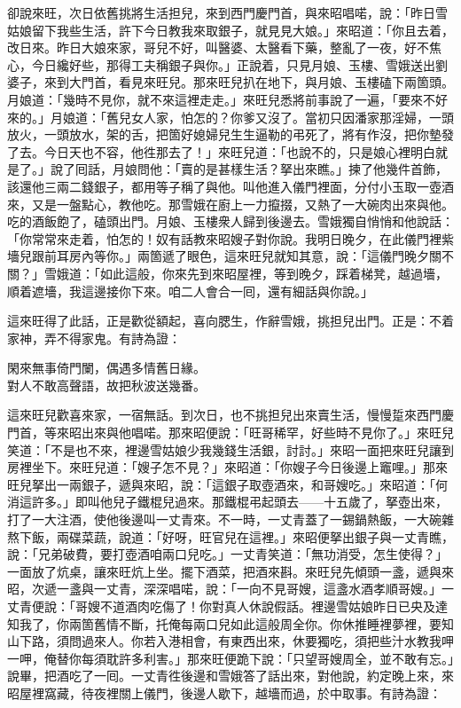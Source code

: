 卻說來旺，次日依舊挑將生活担兒，來到西門慶門首，與來昭唱喏，說：「昨日雪姑娘留下我些生活，許下今日教我來取銀子，就見見大娘。」來昭道：「你且去着，改日來。昨日大娘來家，哥兒不好，叫醫婆、太醫看下藥，整亂了一夜，好不焦心，今日纔好些，那得工夫稱銀子與你。」正說着，只見月娘、玉樓、雪娥送出劉婆子，來到大門首，看見來旺兒。那來旺兒扒在地下，與月娘、玉樓磕下兩箇頭。月娘道：「幾時不見你，就不來這裡走走。」來旺兒悉將前事說了一遍，「要來不好來的。」月娘道：「舊兒女人家，怕怎的？你爹又沒了。當初只因潘家那淫婦，一頭放火，一頭放水，架的舌，把箇好媳婦兒生生逼勒的弔死了，將有作沒，把你墊發了去。今日天也不容，他徃那去了！」{}來旺兒道：「也說不的，只是娘心裡明白就是了。」說了囘話，月娘問他：「賣的是甚樣生活？拏出來瞧。」揀了他幾件首飾，該還他三兩二錢銀子，都用等子稱了與他。叫他進入儀門裡面，{}分付小玉取一壺酒來，又是一盤點心，教他吃。那雪娥在廚上一力攛掇，又熱了一大碗肉出來與他。吃的酒飯飽了，磕頭出門。月娘、玉樓衆人歸到後邊去。{}雪娥獨自悄悄和他說話：「你常常來走着，怕怎的！奴有話教來昭嫂子對你說。我明日晚夕，在此儀門裡紫墻兒跟前耳房內等你。」兩箇遞了眼色，這來旺兒就知其意，說：「這儀門晚夕關不關？」雪娥道：「如此這般，你來先到來昭屋裡，等到晚夕，踩着梯凳，越過墻，順着遮墻，我這邊接你下來。咱二人會合一囘，還有細話與你說。」

這來旺得了此話，正是歡從額起，喜向腮生，作辭雪娥，挑担兒出門。正是：不着家神，弄不得家鬼。有詩為證：

\begin{myquote}
閑來無事倚門闌，偶遇多情舊日緣。\\對人不敢高聲語，故把秋波送幾番。
\end{myquote}

這來旺兒歡喜來家，一宿無話。到次日，也不挑担兒出來賣生活，慢慢踅來西門慶門首，等來昭出來與他唱喏。那來昭便說：「旺哥稀罕，好些時不見你了。」來旺兒笑道：「不是也不來，裡邊雪姑娘少我幾錢生活銀，討討。」來昭一面把來旺兒讓到房裡坐下。來旺兒道：「嫂子怎不見？」來昭道：「你嫂子今日後邊上竈哩。」那來旺兒拏出一兩銀子，遞與來昭，{}說：「這銀子取壺酒來，和哥嫂吃。」來昭道：「何消這許多。」即叫他兒子鐵棍兒過來。那鐵棍弔起頭去——十五歲了，拏壺出來，打了一大注酒，使他後邊叫一丈青來。不一時，一丈青蓋了一錫鍋熱飯，一大碗雜熬下飯，兩碟菜蔬，說道：「好呀，旺官兒在這裡。」來昭便拏出銀子與一丈青瞧，說：「兄弟破費，要打壺酒咱兩口兒吃。」一丈青笑道：「無功消受，怎生使得？」一面放了炕桌，讓來旺炕上坐。擺下酒菜，把酒來斟。來旺兒先傾頭一盞，遞與來昭，次遞一盞與一丈青，深深唱喏，說：「一向不見哥嫂，這盞水酒孝順哥嫂。」一丈青便說：「哥嫂不道酒肉吃傷了！你對真人休說假話。裡邊雪姑娘昨日已央及達知我了，你兩箇舊情不斷，托俺每兩口兒如此這般周全你。你休推睡裡夢裡，要知山下路，須問過來人。你若入港相會，有東西出來，休要獨吃，須把些汁水教我呷一呷，俺替你每須耽許多利害。」那來旺便跪下說：「只望哥嫂周全，並不敢有忘。」說畢，把酒吃了一囘。一丈青徃後邊和雪娥答了話出來，對他說，約定晚上來，來昭屋裡窩藏，待夜裡關上儀門，後邊人歇下，越墻而過，於中取事。有詩為證：

